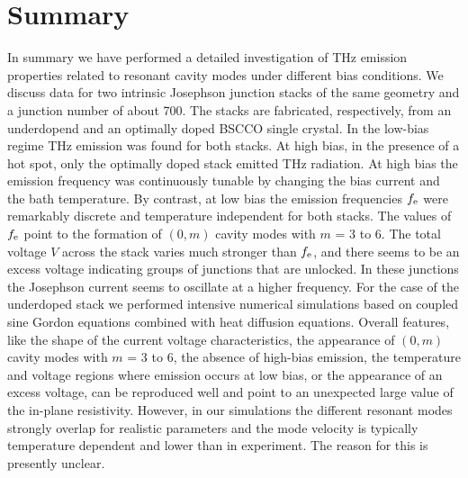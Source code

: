 \documentclass[aps,twocolumn,prb,showpacs,preprintnumbers,superscriptaddress,amsmath,amssymb,longbibliography]{revtex4-1}
\begin{document}
\section{Summary}
\label{sec:Summary}
In summary we have performed a detailed investigation of THz emission properties related to resonant cavity modes under different bias conditions. We discuss data for two intrinsic Josephson junction stacks of the same geometry and a junction number of about 700. The stacks are fabricated, respectively, from an underdopend and an optimally doped BSCCO single crystal. 
In the low-bias regime THz emission was found for both stacks.  At high bias, in the presence of a hot spot, only the optimally doped stack emitted THz radiation. At high bias the emission frequency was continuously tunable by changing the bias current and the bath temperature. By contrast, at low bias the emission frequencies $f_{\rm e}$ were remarkably discrete and temperature independent for both stacks. The values of $f_{\rm e}$ point to the formation of $(0,m)$ cavity modes with $m$ = 3 to 6. The total voltage $V$ across the stack varies much stronger than $f_{\rm e}$, and there seems to be an excess voltage indicating groups of junctions that are unlocked. In these junctions the Josephson current seems to oscillate at a higher frequency. For the case of the underdoped stack we performed intensive numerical simulations based on coupled sine Gordon equations combined with heat diffusion equations. Overall features, like the shape of the current voltage characteristics, the appearance of $(0,m)$ cavity modes with $m$ = 3 to 6, the absence of high-bias emission, the temperature and voltage regions where emission occurs at low bias, or the appearance of an excess voltage, can be reproduced well and point to an unexpected large value of the in-plane resistivity.  However, in our simulations the different resonant modes strongly overlap for realistic parameters and the mode velocity is typically temperature dependent and lower than in experiment. The reason for this is presently unclear.
\end{document}
